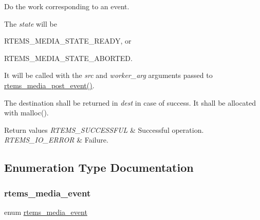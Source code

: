 Do the work corresponding to an event. 

The {\itshape state} will be
\begin{DoxyItemize}
\item R\+T\+E\+M\+S\+\_\+\+M\+E\+D\+I\+A\+\_\+\+S\+T\+A\+T\+E\+\_\+\+R\+E\+A\+DY, or
\item R\+T\+E\+M\+S\+\_\+\+M\+E\+D\+I\+A\+\_\+\+S\+T\+A\+T\+E\+\_\+\+A\+B\+O\+R\+T\+ED.
\end{DoxyItemize}

It will be called with the {\itshape src} and {\itshape worker\+\_\+arg} arguments passed to \mbox{\hyperlink{group__RTEMSIOMedia_ga1904455ab5f9099298ff4d78fd60d3d4}{rtems\+\_\+media\+\_\+post\+\_\+event()}}.

The destination shall be returned in {\itshape dest} in case of success. It shall be allocated with malloc().


\begin{DoxyRetVals}{Return values}
{\em R\+T\+E\+M\+S\+\_\+\+S\+U\+C\+C\+E\+S\+S\+F\+UL} & Successful operation. \\
\hline
{\em R\+T\+E\+M\+S\+\_\+\+I\+O\+\_\+\+E\+R\+R\+OR} & Failure. \\
\hline
\end{DoxyRetVals}


\subsection{Enumeration Type Documentation}
\mbox{\label{group__RTEMSIOMedia_gadd58c5799ee997413d4d6be2ac05197b}} 
\subsubsection{\texorpdfstring{rtems\_media\_event}{rtems\_media\_event}}
{\footnotesize\ttfamily enum \mbox{\hyperlink{group__RTEMSIOMedia_gadd58c5799ee997413d4d6be2ac05197b}{rtems\+\_\+media\+\_\+event}}}

